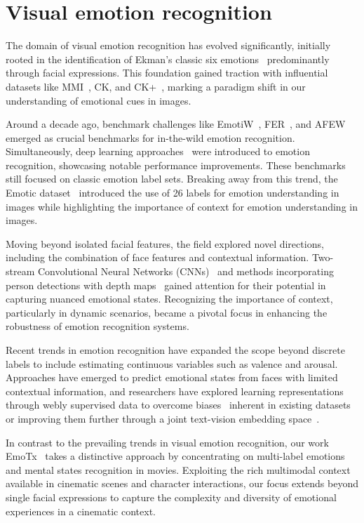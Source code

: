 \section{Visual emotion recognition}
\label{sec:visualEmoRecog}
The domain of visual emotion recognition has evolved significantly, initially rooted in the identification of Ekman's classic six emotions~\cite{Ekman1971} predominantly through facial expressions. This foundation gained traction with influential datasets like MMI~\cite{pantic2005}, CK, and CK+~\cite{tian2001CK, lucey2010CKplus}, marking a paradigm shift in our understanding of emotional cues in images.

Around a decade ago, benchmark challenges like EmotiW~\cite{DhallEmotiW13}, FER~\cite{fer13}, and AFEW~\cite{afew} emerged as crucial benchmarks for in-the-wild emotion recognition. Simultaneously, deep learning approaches~\cite{Liu2014DeeplyLD, Liu2014FacialER} were introduced to emotion recognition, showcasing notable performance improvements. These benchmarks still focused on classic emotion label sets. Breaking away from this trend, the Emotic dataset~\cite{emotic} introduced the use of 26 labels for emotion understanding in images while highlighting the importance of context for emotion understanding in images.

Moving beyond isolated facial features, the field explored novel directions, including the combination of face features and contextual information. Two-stream Convolutional Neural Networks (CNNs)~\cite{caer} and methods incorporating person detections with depth maps~\cite{emoticon} gained attention for their potential in capturing nuanced emotional states. Recognizing the importance of context, particularly in dynamic scenarios, became a pivotal focus in enhancing the robustness of emotion recognition systems.

Recent trends in emotion recognition have expanded the scope beyond discrete labels to include estimating continuous variables such as valence and arousal. Approaches have emerged to predict emotional states from faces with limited contextual information, and researchers have explored learning representations through webly supervised data to overcome biases~\cite{PandaDE} inherent in existing datasets or improving them further through a joint text-vision embedding space~\cite{WeiEmotionNet}.

In contrast to the prevailing trends in visual emotion recognition, our work EmoTx~\cite{dhruv2023emotx} takes a distinctive approach by concentrating on multi-label emotions and mental states recognition in movies. Exploiting the rich multimodal context available in cinematic scenes and character interactions, our focus extends beyond single facial expressions to capture the complexity and diversity of emotional experiences in a cinematic context.
